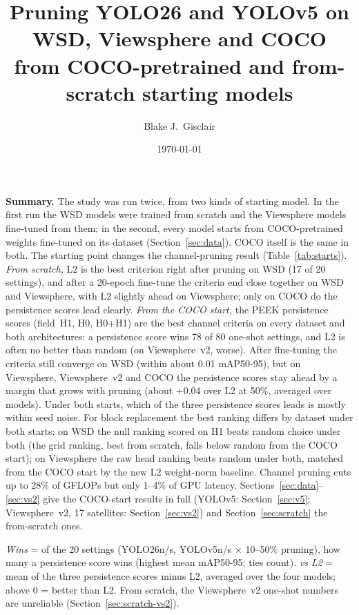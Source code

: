 \documentclass[10pt]{article}
\title{\vspace{-1.5em}Pruning YOLO26 and YOLOv5 on WSD, Viewsphere and COCO\\ from COCO-pretrained and from-scratch starting models\vspace{-0.5em}}
\author{Blake J.\ Gisclair}
\date{\today}
\newcommand{\tnote}[1]{\par\vspace{3pt}\begin{minipage}{\linewidth}\footnotesize #1\end{minipage}}  %
\newcommand{\tbl}[1]{\adjustbox{max width=\linewidth}{}}
\begin{document}
\maketitle

\noindent\textbf{Summary.} The study was run twice, from two kinds of starting model. In the first run
the WSD models were trained from scratch and the Viewsphere models fine-tuned from them; in the second,
every model starts from COCO-pretrained weights fine-tuned on its dataset (Section~\ref{sec:data}).
COCO itself is the same in both. The starting point changes the channel-pruning result
(Table~\ref{tab:starts}). \emph{From scratch,} L2 is the best criterion right after pruning on WSD
(17 of 20 settings), and after a 20-epoch fine-tune the criteria end close together on WSD and
Viewsphere, with L2 slightly ahead on Viewsphere; only on COCO do the persistence scores lead clearly.
\emph{From the COCO start,} the PEEK persistence scores (field~H1, H0, H0+H1) are the best channel
criteria on every dataset and both architectures: a persistence score wins 78 of 80 one-shot settings,
and L2 is often no better than random (on Viewsphere~v2, worse). After fine-tuning the criteria still
converge on WSD (within about 0.01 mAP50-95), but on Viewsphere, Viewsphere~v2 and COCO the persistence
scores stay ahead by a margin that grows with pruning (about +0.04 over L2 at 50\%, averaged over
models). Under both starts, which of the three persistence scores leads is mostly within seed noise.
For block replacement the best ranking differs by dataset under both starts: on WSD the null ranking
scored on H1 beats random choice under both (the grid ranking, best from scratch, falls below random
from the COCO start); on Viewsphere the raw head ranking beats random under both, matched from the COCO
start by the new L2 weight-norm baseline. Channel pruning cuts up to 28\% of GFLOPs but only 1--4\% of
GPU latency. Sections~\ref{sec:data}--\ref{sec:vs2} give the COCO-start results in full (YOLOv5:
Section~\ref{sec:v5}; Viewsphere~v2, 17 satellites: Section~\ref{sec:vs2}) and
Section~\ref{sec:scratch} the from-scratch ones.

\begin{table}[H]
\centering\small
\caption{Channel pruning from the two starting models}
\label{tab:starts}
\tbl{start_compare}
\tnote{\emph{Wins} = of the 20 settings (YOLO26n/s, YOLOv5n/s $\times$ 10--50\% pruning), how many a
persistence score wins (highest mean mAP50-95; ties count). \emph{vs L2} = mean of the three persistence
scores minus L2, averaged over the four models; above 0 = better than L2. From scratch, the Viewsphere~v2
one-shot numbers are unreliable (Section~\ref{sec:scratch-vs2}).}
\end{table}
\end{document}
